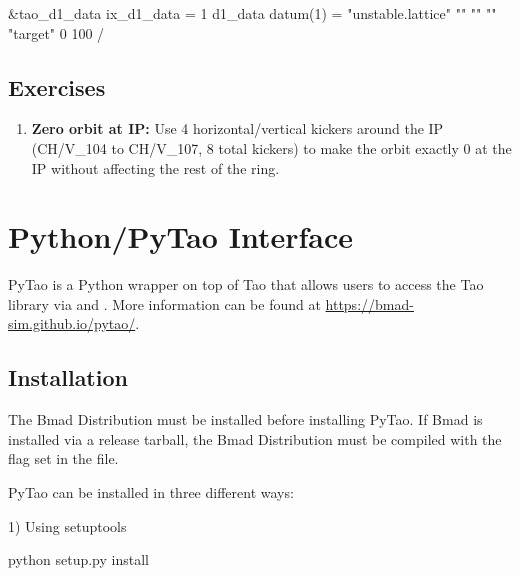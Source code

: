 \documentclass{hitec}     %
\begin{document}
{{{{\begin{enumerate}[leftmargin=*]
\begin{code}
&tao_d1_data
	ix_d1_data = 1
	d1_data%
	datum(1) = "unstable.lattice" "" "" "" "target" 0 100
/
\end{code}

\end{enumerate}

\subsection{Exercises}

\begin{enumerate}[leftmargin=*]
%
\item {\bf Zero orbit at IP:}
Use 4 horizontal/vertical kickers around the IP (CH/V\_104 to CH/V\_107, 8 total kickers) to make the orbit exactly 0 at the IP without affecting the rest of the ring.
%
\end{enumerate}

\newpage

\appendix

\section{Python/PyTao Interface}

PyTao is a Python wrapper on top of Tao that allows users to access the Tao library via  and . More information can be found at \url{https://bmad-sim.github.io/pytao/}.

\subsection{Installation}

The Bmad Distribution must be installed before installing PyTao. If Bmad is installed via a release tarball, the Bmad Distribution must be compiled with the  flag set in the  file. 

PyTao can be installed in three different ways:

1) Using setuptools
\begin{code}
python setup.py install
\end{code}

}}}}
\end{document}
